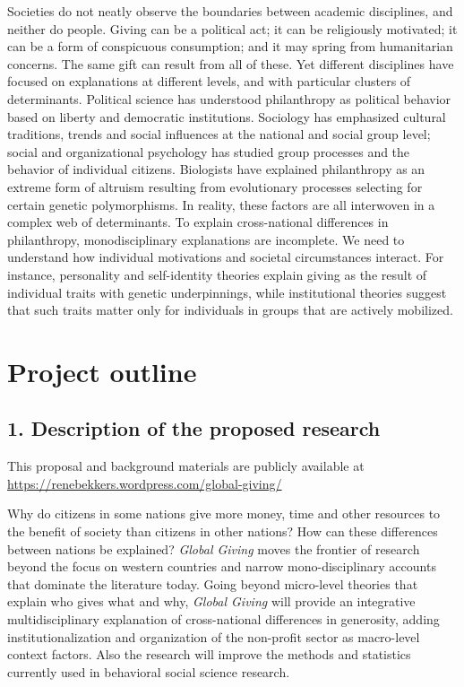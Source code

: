 \documentclass[twocolumn, serif, rga, numeric]{jote-article}
\begin{document}
Societies do not neatly observe the boundaries between academic disciplines, and neither do people. Giving can be a political act; it can be religiously motivated; it can be a form of conspicuous consumption; and it may spring from humanitarian concerns. The same gift can result from all of these. Yet different disciplines have focused on explanations at different levels, and with particular clusters of determinants. Political science has understood philanthropy as political behavior based on liberty and democratic institutions. Sociology has emphasized cultural traditions, trends and social influences at the national and social group level; social and organizational psychology has studied group processes and the behavior of individual citizens.
Biologists have explained philanthropy as an extreme form of altruism resulting from evolutionary processes selecting for certain genetic polymorphisms. In reality, these factors are all interwoven in a complex web of determinants. To explain cross-national differences in philanthropy, monodisciplinary explanations are incomplete. We need to understand how individual motivations and societal circumstances interact. For instance, personality and self-identity theories explain giving as the result of individual traits with genetic underpinnings, while institutional theories suggest that such traits matter only for individuals in groups that are actively mobilized.

 {}\section*{Project outline} 

 {}\subsection*{1. Description of the proposed research} 

This proposal and background materials are publicly available at \url{https://renebekkers.wordpress.com/global-giving/}

Why do citizens in some nations give more money, time and other resources to the benefit of society than citizens in other nations? How can these differences between nations be explained? \emph{Global Giving}
moves the frontier of research beyond the focus on western countries and narrow mono-disciplinary accounts that dominate the literature today.
Going beyond micro-level theories that explain who gives what and why, \emph{Global Giving} will provide an integrative multidisciplinary explanation of cross-national differences in generosity, adding institutionalization and organization of the non-profit sector as macro-level context factors. Also the research will improve the methods and statistics currently used in behavioral social science research.
\end{document}
